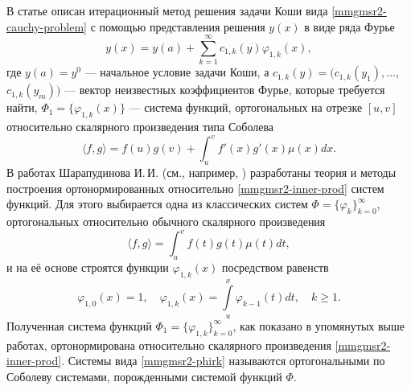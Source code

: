 В статье \cite{RamSharDemr} описан итерационный метод решения задачи Коши вида \eqref{mmgmsr2-cauchy-problem} с помощью представления решения $y(x)$ в виде ряда Фурье
\begin{equation}\label{mmgmsr2-fourier-series-r=1}
y(x) = y(a)+\sum\limits_{k=1}^{\infty}c_{1,k}(y)\varphi_{1,k}(x),
\end{equation}
где $y(a)=y^0$ --- начальное условие задачи Коши, а $c_{1,k}(y)=(c_{1,k}(y_1),\ldots,$$c_{1,k}(y_m))$ --- вектор неизвестных коэффициентов Фурье, которые требуется найти, $\Phi_1=\{\varphi_{1,k}(x)\}$ --- система функций, ортогональных на отрезке $[u,v]$ относительно скалярного произведения типа Соболева
\begin{equation}\label{mmgmsr2-inner-prod}
\langle f,g \rangle =
f(u)g(v)+\int_{u}^{v}f'(x)g'(x)\mu(x)dx.
\end{equation}
В работах Шарапудинова И.\,И. (см., например, \cite{mmgmsr1-SharapudinovMuratova, mmgmsr2-Shii-asymp-demi2016, mmgmsr1-ShaGad16, mmgmsr1-Shii-matzam2017, mmgmsr1-Shii-Shti-izvvuzov2017, mmgmsr1-Shii-lag-demi2015, mmgmsr1-SHII-MMG-Demi2015}) разработаны теория и методы построения ортонормированных относительно \eqref{mmgmsr2-inner-prod} систем функций.
Для этого выбирается одна из классических систем $\Phi =\{\varphi_k\}_{k=0}^\infty$, ортогональных
относительно обычного скалярного произведения
\begin{equation}\label{mmgmsr2-classic-mul}
\langle f,g \rangle =\int_{u}^{v}f(t)g(t)\mu(t)dt,
\end{equation}
и на её основе строятся функции $\varphi_{1,k}(x)$ посредством равенств
\begin{equation}\label{mmgmsr2-phirk}
\varphi_{1,0}(x) =1, \quad
\varphi_{1,k}(x) =\int\limits_{u}^x\varphi_{k-1}(t)dt, \quad k \ge 1.
\end{equation}
Полученная система функций $\Phi_1=\{\varphi_{1,k}\}_{k=0}^\infty$, как показано в упомянутых выше работах, ортонормирована относительно скалярного произведения \eqref{mmgmsr2-inner-prod}. Системы вида \eqref{mmgmsr2-phirk} называются ортогональными по Соболеву системами, порожденными системой функций $\Phi$.

